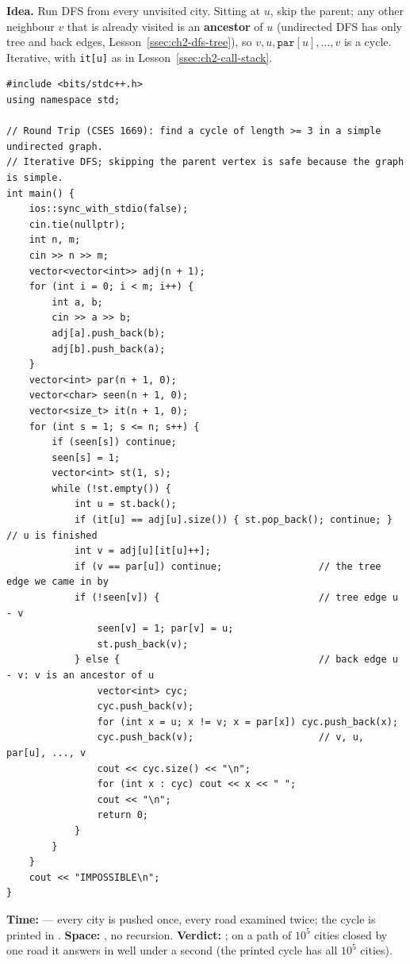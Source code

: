 \begin{algorithmbox}
\textbf{Idea.} Run DFS from every unvisited city. Sitting at $u$, skip the parent; any other neighbour $v$ that is already visited is an \textbf{ancestor} of $u$ (undirected DFS has only tree and back edges, Lesson~\ref{ssec:ch2-dfs-tree}), so $v, u, \texttt{par}[u], \dots, v$ is a cycle. Iterative, with \texttt{it[u]} as in Lesson~\ref{ssec:ch2-call-stack}.

\begin{lstlisting}[style=cpp]
#include <bits/stdc++.h>
using namespace std;

// Round Trip (CSES 1669): find a cycle of length >= 3 in a simple undirected graph.
// Iterative DFS; skipping the parent vertex is safe because the graph is simple.
int main() {
    ios::sync_with_stdio(false);
    cin.tie(nullptr);
    int n, m;
    cin >> n >> m;
    vector<vector<int>> adj(n + 1);
    for (int i = 0; i < m; i++) {
        int a, b;
        cin >> a >> b;
        adj[a].push_back(b);
        adj[b].push_back(a);
    }
    vector<int> par(n + 1, 0);
    vector<char> seen(n + 1, 0);
    vector<size_t> it(n + 1, 0);
    for (int s = 1; s <= n; s++) {
        if (seen[s]) continue;
        seen[s] = 1;
        vector<int> st(1, s);
        while (!st.empty()) {
            int u = st.back();
            if (it[u] == adj[u].size()) { st.pop_back(); continue; }   // u is finished
            int v = adj[u][it[u]++];
            if (v == par[u]) continue;                 // the tree edge we came in by
            if (!seen[v]) {                            // tree edge u - v
                seen[v] = 1; par[v] = u;
                st.push_back(v);
            } else {                                   // back edge u - v: v is an ancestor of u
                vector<int> cyc;
                cyc.push_back(v);
                for (int x = u; x != v; x = par[x]) cyc.push_back(x);
                cyc.push_back(v);                      // v, u, par[u], ..., v
                cout << cyc.size() << "\n";
                for (int x : cyc) cout << x << " ";
                cout << "\n";
                return 0;
            }
        }
    }
    cout << "IMPOSSIBLE\n";
}
\end{lstlisting}

\begin{complexitybox}
\textbf{Time:} \VE{} --- every city is pushed once, every road examined twice; the cycle is printed in . \textbf{Space:} , no recursion. \textbf{Verdict:} \ac{}; on a path of $10^5$ cities closed by one road it answers in well under a second (the printed cycle has all $10^5$ cities).
\end{complexitybox}
\end{algorithmbox}

